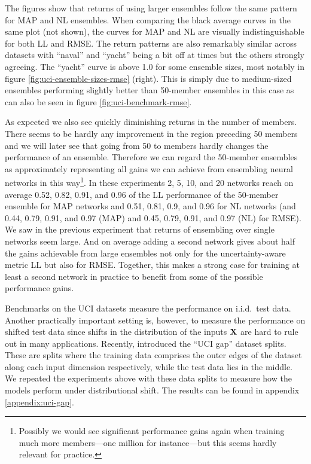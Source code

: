 \documentclass[../thesis.tex]{subfiles}
\begin{document}
The figures show that returns of using larger ensembles follow the same pattern for MAP and NL ensembles. When comparing the black average curves in the same plot (not shown), the curves for MAP and NL are visually indistinguishable for both LL and RMSE. The return patterns are also remarkably similar across datasets with ``naval'' and ``yacht'' being a bit off at times but the others strongly agreeing. The ``yacht'' curve is above 1.0 for some ensemble sizes, most notably in figure \ref{fig:uci-ensemble-sizes-rmse} (right). This is simply due to medium-sized ensembles performing slightly better than 50-member ensembles in this case as can also be seen in figure \ref{fig:uci-benchmark-rmse}.

As expected we also see quickly diminishing returns in the number of members. There seems to be hardly any improvement in the region preceding 50 members and we will later see that going from 50 to  members hardly changes the performance of an ensemble. Therefore we can regard the 50-member ensembles as approximately representing all gains we can achieve from ensembling neural networks in this way\footnote{Possibly we would see significant performance gains again when training much more members---one million for instance---but this seems hardly relevant for practice.}. In these experiments 2, 5, 10, and 20 networks reach on average 0.52, 0.82, 0.91, and 0.96 of the LL performance of the 50-member ensemble for MAP networks and 0.51, 0.81, 0.9, and 0.96 for NL networks (and 0.44, 0.79, 0.91, and 0.97 (MAP) and 0.45, 0.79, 0.91, and 0.97 (NL) for RMSE). We saw in the previous experiment that returns of ensembling over single networks seem large. And on average adding a second network gives about half the gains achievable from large ensembles not only for the uncertainty-aware metric LL but also for RMSE. Together, this makes a strong case for training at least a second network in practice to benefit from some of the possible performance gains.

Benchmarks on the UCI datasets measure the performance on i.i.d.\ test data. Another practically important setting is, however, to measure the performance on shifted test data since shifts in the distribution of the inputs $\boldsymbol{\mathbf{X}}$ are hard to rule out in many applications. Recently, \textcite{foong2019between} introduced the ``UCI gap'' dataset splits. These are splits where the training data comprises the outer edges of the dataset along each input dimension respectively, while the test data lies in the middle. We repeated the experiments above with these data splits to measure how the models perform under distributional shift. The results can be found in appendix \ref{appendix:uci-gap}.
\end{document}
